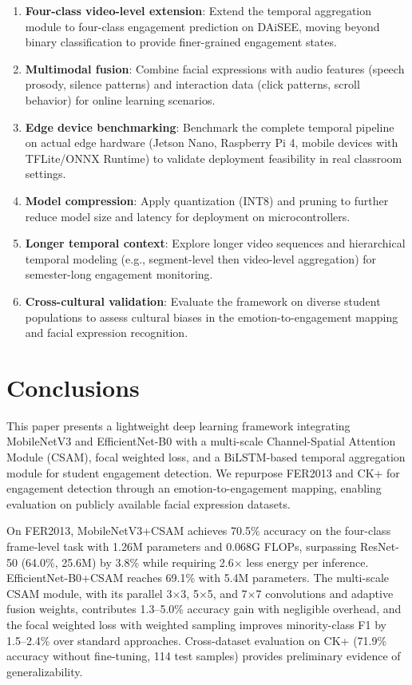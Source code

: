\documentclass[sensors,article,submit,pdftex,moreauthors]{Definitions/mdpi}
\begin{document}
\begin{enumerate}
\item \textbf{Four-class video-level extension}: Extend the temporal aggregation module to four-class engagement prediction on DAiSEE, moving beyond binary classification to provide finer-grained engagement states.
\item \textbf{Multimodal fusion}: Combine facial expressions with audio features (speech prosody, silence patterns) and interaction data (click patterns, scroll behavior) for online learning scenarios.
\item \textbf{Edge device benchmarking}: Benchmark the complete temporal pipeline on actual edge hardware (Jetson Nano, Raspberry Pi 4, mobile devices with TFLite/ONNX Runtime) to validate deployment feasibility in real classroom settings.
\item \textbf{Model compression}: Apply quantization (INT8) and pruning to further reduce model size and latency for deployment on microcontrollers.
\item \textbf{Longer temporal context}: Explore longer video sequences and hierarchical temporal modeling (e.g., segment-level then video-level aggregation) for semester-long engagement monitoring.
\item \textbf{Cross-cultural validation}: Evaluate the framework on diverse student populations to assess cultural biases in the emotion-to-engagement mapping and facial expression recognition.
\end{enumerate}

\section{Conclusions}
\label{sec:conclusion}

This paper presents a lightweight deep learning framework integrating MobileNetV3 and EfficientNet-B0 with a multi-scale Channel-Spatial Attention Module (CSAM), focal weighted loss, and a BiLSTM-based temporal aggregation module for student engagement detection. We repurpose FER2013 and CK+ for engagement detection through an emotion-to-engagement mapping, enabling evaluation on publicly available facial expression datasets.

On FER2013, MobileNetV3+CSAM achieves 70.5\% accuracy on the four-class frame-level task with 1.26M parameters and 0.068G FLOPs, surpassing ResNet-50 (64.0\%, 25.6M) by 3.8\% while requiring 2.6$\times$ less energy per inference. EfficientNet-B0+CSAM reaches 69.1\% with 5.4M parameters. The multi-scale CSAM module, with its parallel 3$\times$3, 5$\times$5, and 7$\times$7 convolutions and adaptive fusion weights, contributes 1.3--5.0\% accuracy gain with negligible overhead, and the focal weighted loss with weighted sampling improves minority-class F1 by 1.5--2.4\% over standard approaches. Cross-dataset evaluation on CK+ (71.9\% accuracy without fine-tuning, 114 test samples) provides preliminary evidence of generalizability.
\end{document}

